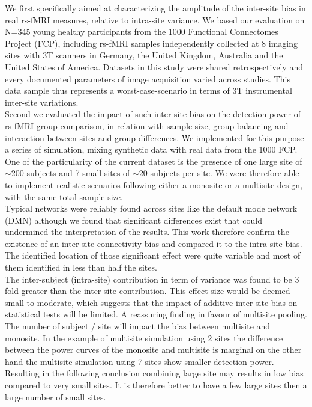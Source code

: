 \documentclass[authoryear]{elsarticle}
\begin{document}
We first specifically aimed at characterizing the amplitude of the inter-site bias in real rs-fMRI measures, relative to intra-site variance. We based our evaluation on N=345 young healthy participants from the 1000 Functional Connectomes Project (FCP), including rs-fMRI samples independently collected at 8 imaging sites with 3T scanners in Germany, the United Kingdom, Australia and the United States of America. Datasets in this study were shared retrospectively and every documented parameters of image acquisition varied across studies. This data sample thus represents a worst-case-scenario in terms of 3T instrumental inter-site variations.\\

Second we evaluated the impact of such inter-site bias on the detection power of rs-fMRI group comparison, in relation with sample size, group balancing and interaction between sites and group differences. We implemented for this purpose a series of simulation, mixing synthetic data with real data from the 1000 FCP. One of the particularity of the current dataset is the presence of one large site of $\sim200$ subjects and 7 small sites of $\sim20$ subjects per site. We were therefore able to implement realistic scenarios following either a monosite or a multisite design, with the same total sample size.\\

Typical networks were reliably found across sites like the default mode network (DMN) although we found that significant differences exist that could undermined the interpretation of the results. This work therefore confirm the existence of an inter-site connectivity bias and compared it to the intra-site bias. The identified location of those significant effect were quite variable and most of them identified in less than half the sites.\\

The inter-subject (intra-site) contribution in term of variance was found to be 3 fold greater than the inter-site contribution. This effect size would be deemed small-to-moderate, which suggests that the impact of additive inter-site bias on statistical tests will be limited. A reassuring finding in favour of multisite pooling.\\

The number of subject / site will impact the bias between multisite and monosite. In the example of multisite simulation using 2 sites the difference between the power curves of the monosite and multisite is marginal on the other hand the multisite simulation using 7 sites show smaller detection power. Resulting in the following conclusion combining large site may results in low bias compared to very small sites. It is therefore better to have a few large sites then a large number of small sites.\\
\end{document}
